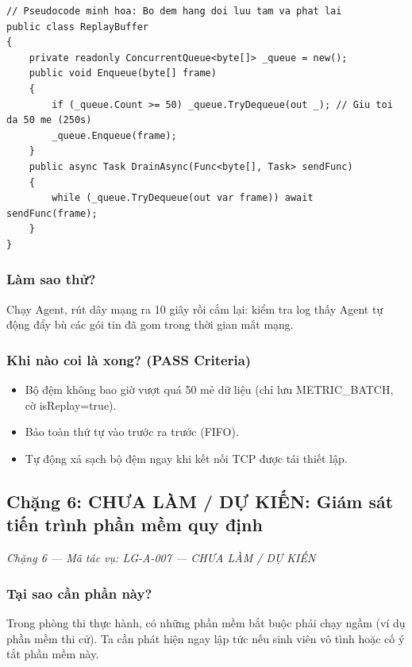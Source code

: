 \documentclass[12pt,a4paper]{article}
\begin{document}
\begin{lstlisting}[language=CSharp, caption={Pseudocode minh họa: Bộ đệm hàng đợi lưu tạm và phát lại}]
// Pseudocode minh hoa: Bo dem hang doi luu tam va phat lai
public class ReplayBuffer
{
    private readonly ConcurrentQueue<byte[]> _queue = new();
    public void Enqueue(byte[] frame)
    {
        if (_queue.Count >= 50) _queue.TryDequeue(out _); // Giu toi da 50 me (250s)
        _queue.Enqueue(frame);
    }
    public async Task DrainAsync(Func<byte[], Task> sendFunc)
    {
        while (_queue.TryDequeue(out var frame)) await sendFunc(frame);
    }
}
\end{lstlisting}

\subsubsection{Làm sao thử?}
Chạy Agent, rút dây mạng ra 10 giây rồi cắm lại: kiểm tra log thấy Agent tự động đẩy bù các gói tin đã gom trong thời gian mất mạng.

\subsubsection{Khi nào coi là xong? (PASS Criteria)}
\begin{itemize}
  \item Bộ đệm không bao giờ vượt quá 50 mẻ dữ liệu (chỉ lưu METRIC\_BATCH, cờ isReplay=true).
  \item Bảo toàn thứ tự vào trước ra trước (FIFO).
  \item Tự động xả sạch bộ đệm ngay khi kết nối TCP được tái thiết lập.
\end{itemize}

\subsection{Chặng 6: CHƯA LÀM / DỰ KIẾN: Giám sát tiến trình phần mềm quy định}
{\footnotesize\color{lgGray}\textit{Chặng 6 — Mã tác vụ: LG-A-007 — CHƯA LÀM / DỰ KIẾN}}\par
\vspace{2mm}

\subsubsection{Tại sao cần phần này?}
Trong phòng thi thực hành, có những phần mềm bắt buộc phải chạy ngầm (ví dụ phần mềm thi cử). Ta cần phát hiện ngay lập tức nếu sinh viên vô tình hoặc cố ý tắt phần mềm này.
\end{document}
